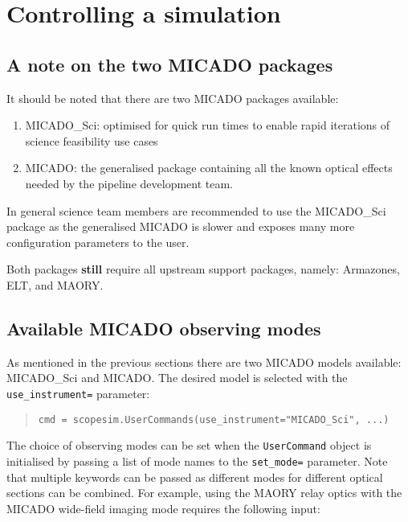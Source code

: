 

\section{Controlling a simulation%
  \label{controlling-a-simulation}%
}


\subsection{A note on the two MICADO packages%
  \label{a-note-on-the-two-micado-packages}%
}

It should be noted that there are two MICADO packages available:

\begin{enumerate}
\item MICADO\_Sci: optimised for quick run times to enable rapid iterations of science feasibility use cases

\item MICADO: the generalised package containing all the known optical effects needed by the pipeline development team.
\end{enumerate}

In general science team members are recommended to use the MICADO\_Sci package as the generalised MICADO is slower and exposes many more configuration parameters to the user.

Both packages \textbf{still} require all upstream support packages, namely: Armazones, ELT, and MAORY.


\subsection{Available MICADO observing modes%
  \label{available-micado-observing-modes}%
}

As mentioned in the previous sections there are two MICADO models available: MICADO\_Sci and MICADO.
The desired model is selected with the \texttt{use\_instrument=} parameter:

\begin{quote}
\begin{alltt}
\begin{lstlisting}[frame=single]
cmd = scopesim.UserCommands(use_instrument="MICADO_Sci", ...)
\end{lstlisting}
\end{alltt}
\end{quote}

The choice of observing modes can be set when the \texttt{UserCommand} object is initialised by passing a list of mode names to the \texttt{set\_mode=} parameter.
Note that multiple keywords can be passed as different modes for different optical sections can be combined.
For example, using the MAORY relay optics with the MICADO wide-field imaging mode requires the following input:

